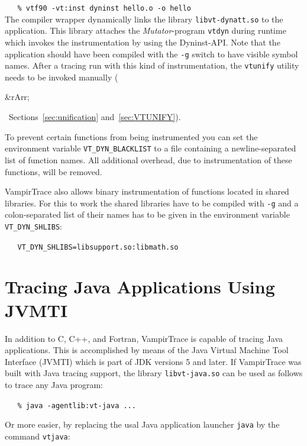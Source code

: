 \documentclass[a4paper,twoside,12pt,BCOR12mm]{scrbook}
\newcommand{\rarr}{$\Rightarrow$}  %
\renewcommand{\rarr}{\begin{rawhtml}&rArr;\end{rawhtml}}   %
\begin{document}
\vspace{1ex}
\verb|   % vtf90 -vt:inst dyninst hello.o -o hello|
\vspace{1ex}\\
  The compiler wrapper dynamically links the library \texttt{libvt-dynatt.so}
  to the  application. This library attaches the \textit{Mutator}-program
  \texttt{vtdyn} during runtime which invokes the instrumentation by using 
  the Dyninst-API.
  Note that the application should have been compiled with the \texttt{-g}
  switch to have visible symbol names.
  After a tracing run with this kind of instrumentation, the \texttt{vtunify}
  utility needs to be invoked manually (\rarr\ Sections~\ref{sec:unification} and~\ref{sec:VTUNIFY}).

  To prevent certain functions from being instrumented you can set
  the environment variable \texttt{VT\_DYN\_BLACKLIST} to a file containing
  a newline-separated list of function names. All additional overhead, due to instrumentation
  of these functions, will be removed.
  
  VampirTrace also allows binary instrumentation of functions located in shared libraries.
  For this to work the shared libraries have to be compiled with \texttt{-g} and 
  a colon-separated list of their names has to be given in
  the environment variable \texttt{VT\_DYN\_SHLIBS}:
  
  \vspace{1ex}
  \verb|   VT_DYN_SHLIBS=libsupport.so:libmath.so|
  \vspace{1ex}

\section{Tracing Java Applications Using JVMTI}
\label{sec:jvmti}
  In addition to C, C++, and Fortran, VampirTrace is capable of tracing Java
  applications. This is accomplished by means of the Java Virtual Machine Tool
  Interface (JVMTI) which is part of JDK versions 5 and later.
  If VampirTrace was built with Java tracing support, the library \texttt{libvt-java.so}
  can be used as follows to trace any Java program: 

  \vspace{1ex}
  \verb|   % java -agentlib:vt-java ...|
  \vspace{1ex}

  Or more easier, by replacing the usal Java application launcher \texttt{java} by the command \texttt{vtjava}:
\end{document}
